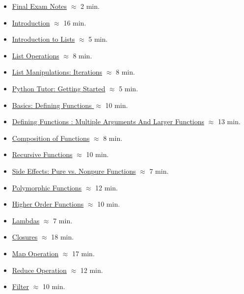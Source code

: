 \begin{itemize}
    \item \href{https://applied.cs.colorado.edu/mod/resource/view.php?id=51884}{Final Exam Notes} $\approx$ 2 min.
    \item \href{https://applied.cs.colorado.edu/mod/hvp/view.php?id=51907}{Introduction} $\approx$ 16 min.
    \item \href{https://applied.cs.colorado.edu/mod/hvp/view.php?id=51908}{Introduction to Lists} $\approx$ 5 min.
    \item \href{https://applied.cs.colorado.edu/mod/hvp/view.php?id=51909}{List Operations} $\approx$ 8 min.
    \item \href{https://applied.cs.colorado.edu/mod/hvp/view.php?id=51910}{List Manipulations: Iterations} $\approx$ 8 min.
    \item \href{https://applied.cs.colorado.edu/mod/hvp/view.php?id=51911}{Python Tutor: Getting Started} $\approx$ 5 min.
    \item \href{https://applied.cs.colorado.edu/mod/hvp/view.php?id=51912}{Basics: Defining Functions } $\approx$ 10 min.
    \item \href{https://applied.cs.colorado.edu/mod/hvp/view.php?id=51913}{Defining Functions : Multiple Arguments And Larger Functions} $\approx$ 13 min.
    \item \href{https://applied.cs.colorado.edu/mod/hvp/view.php?id=51914}{Composition of Functions} $\approx$ 8 min.
    \item \href{https://applied.cs.colorado.edu/mod/hvp/view.php?id=51915}{Recursive Functions} $\approx$ 10 min.
    \item \href{https://applied.cs.colorado.edu/mod/hvp/view.php?id=51916}{Side Effects: Pure vs. Nonpure Functions} $\approx$ 7 min.
    \item \href{https://applied.cs.colorado.edu/mod/hvp/view.php?id=51917}{Polymorphic Functions} $\approx$ 12 min.
    \item \href{https://applied.cs.colorado.edu/mod/hvp/view.php?id=51918}{Higher Order Functions} $\approx$ 10 min.
    \item \href{https://applied.cs.colorado.edu/mod/hvp/view.php?id=51919}{Lambdas} $\approx$ 7 min.
    \item \href{https://applied.cs.colorado.edu/mod/hvp/view.php?id=51920}{Closures} $\approx$ 18 min.
    \item \href{https://applied.cs.colorado.edu/mod/hvp/view.php?id=51921}{Map Operation} $\approx$ 17 min.
    \item \href{https://applied.cs.colorado.edu/mod/hvp/view.php?id=51922}{Reduce Operation} $\approx$ 12 min.
    \item \href{https://applied.cs.colorado.edu/mod/hvp/view.php?id=51923}{Filter} $\approx$ 10 min.
\end{itemize}

